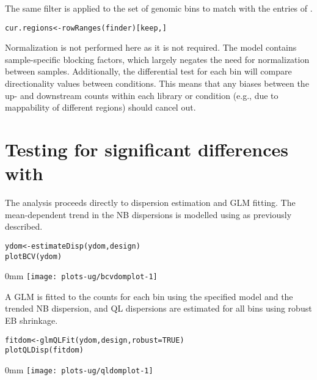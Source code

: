 \documentclass{report}\usepackage[]{graphicx}\usepackage[usenames,dvipsnames]{color}
\makeatletter
\def\maxwidth{ %
  \ifdim\Gin@nat@width>\linewidth
    \linewidth
  \else
    \Gin@nat@width
  \fi
}
\newcommand{\hlnum}[1]{\textcolor[rgb]{0.816,0.125,0.439}{#1}}%
\newcommand{\hlstd}[1]{\textcolor[rgb]{0.251,0.251,0.251}{#1}}%
\newcommand{\hlkwb}[1]{\textcolor[rgb]{0,0,0}{#1}}%
\newcommand{\hlkwc}[1]{\textcolor[rgb]{0.251,0.251,0.251}{#1}}%
\newcommand{\hlkwd}[1]{\textcolor[rgb]{0.878,0.439,0.125}{#1}}%
\newenvironment{knitrout}{}{} %
\makeatother
\begin{document}
The same filter is applied to the set of genomic bins to match with the entries of . 

\begin{knitrout}
\color{fgcolor}\begin{kframe}
\begin{alltt}
\hlstd{cur.regions} \hlkwb{<-} \hlkwd{rowRanges}\hlstd{(finder)[keep,]}
\end{alltt}
\end{kframe}
\end{knitrout}

Normalization is not performed here as it is not required. 
The model contains sample-specific blocking factors, which largely negates the need for normalization between samples.
Additionally, the differential test for each bin will compare directionality values between conditions.
This means that any biases between the up- and downstream counts within each library or condition (e.g., due to mappability of different regions) should cancel out.

\section{Testing for significant differences with }
The analysis proceeds directly to dispersion estimation and GLM fitting.
The mean-dependent trend in the NB dispersions is modelled using  as previously described.

\begin{knitrout}
\color{fgcolor}\begin{kframe}
\begin{alltt}
\hlstd{ydom} \hlkwb{<-} \hlkwd{estimateDisp}\hlstd{(ydom, design)}
\hlkwd{plotBCV}\hlstd{(ydom)}
\end{alltt}
\end{kframe}\begin{adjustwidth}{\fltoffset}{0mm}
\texttt{[image: plots-ug/bcvdomplot-1]} \end{adjustwidth}
\end{knitrout}

A GLM is fitted to the counts for each bin using the specified model and the trended NB dispersion, and QL dispersions are estimated for all bins using robust EB shrinkage.

\begin{knitrout}
\color{fgcolor}\begin{kframe}
\begin{alltt}
\hlstd{fitdom} \hlkwb{<-} \hlkwd{glmQLFit}\hlstd{(ydom, design,} \hlkwc{robust}\hlstd{=}\hlnum{TRUE}\hlstd{)}
\hlkwd{plotQLDisp}\hlstd{(fitdom)}
\end{alltt}
\end{kframe}\begin{adjustwidth}{\fltoffset}{0mm}
\texttt{[image: plots-ug/qldomplot-1]} \end{adjustwidth}
\end{knitrout}
\end{document}
